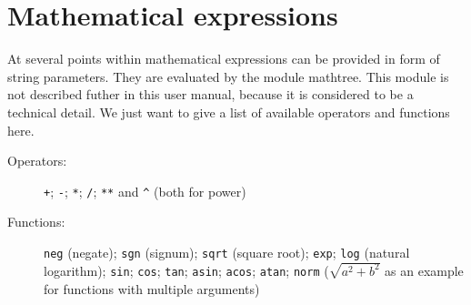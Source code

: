 \chapter{Mathematical expressions}
\label{mathtree}

At several points within \PyX{} mathematical expressions can be
provided in form of string parameters. They are evaluated by the
module mathtree. This module is not described futher in this user
manual, because it is considered to be a technical detail. We just
want to give a list of available operators and functions here.

\begin{description}
\item[Operators:]
\verb|+|; \verb|-|; \verb|*|; \verb|/|; \verb|**| and \verb|^| (both
for power)

\item[Functions:]
\verb|neg| (negate); \verb|sgn| (signum); \verb|sqrt| (square root);
\verb|exp|; \verb|log| (natural logarithm); \verb|sin|; \verb|cos|;
\verb|tan|; \verb|asin|; \verb|acos|; \verb|atan|; \verb|norm|
($\sqrt{a^2+b^2}$ as an example for functions with multiple arguments)
\end{description}
